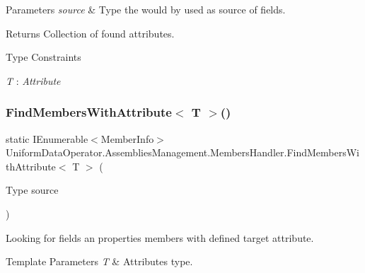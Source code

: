 \begin{DoxyParams}{Parameters}
{\em source} & Type the would by used as source of fields.\\
\hline
\end{DoxyParams}
\begin{DoxyReturn}{Returns}
Collection of found attributes.
\end{DoxyReturn}
\begin{Desc}
\item[Type Constraints]\begin{description}
\item[{\em T} : {\em Attribute}]\end{description}
\end{Desc}
\mbox{\label{class_uniform_data_operator_1_1_assemblies_management_1_1_members_handler_abf58fa664b9202a0776cbb9a1c659ba9}} 
\subsubsection{\texorpdfstring{Find\+Members\+With\+Attribute$<$ T $>$()}{FindMembersWithAttribute< T >()}\hspace{0.1cm}{\footnotesize\ttfamily [1/2]}}
{\footnotesize\ttfamily static I\+Enumerable$<$Member\+Info$>$ Uniform\+Data\+Operator.\+Assemblies\+Management.\+Members\+Handler.\+Find\+Members\+With\+Attribute$<$ T $>$ (\begin{DoxyParamCaption}\item[{Type}]{source }\end{DoxyParamCaption})\hspace{0.3cm}{\ttfamily [static]}}



Looking for fields an properties members with defined target attribute. 


\begin{DoxyTemplParams}{Template Parameters}
{\em T} & Attribute\textquotesingle{}s type.\\
\hline
\end{DoxyTemplParams}

